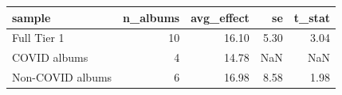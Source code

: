 \begin{tabular}{lrrrr}
\toprule
sample & n\_albums & avg\_effect & se & t\_stat \\
\midrule
Full Tier 1 & 10 & 16.10 & 5.30 & 3.04 \\
COVID albums & 4 & 14.78 & NaN & NaN \\
Non-COVID albums & 6 & 16.98 & 8.58 & 1.98 \\
\bottomrule
\end{tabular}
